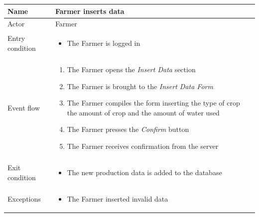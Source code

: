 \begin{table}[H]
    \begin{tabu} to \textwidth {|X|X[4]|}
        \hline
        Name            & Farmer inserts data  \\ \hline
        Actor           & Farmer                      \\ \hline
        Entry condition & \begin{itemize}
            \item The Farmer is logged in
        \end{itemize} \\ \hline
        Event flow      & \begin{enumerate}
            \item The Farmer opens the \emph{Insert Data} section
            \item The Farmer is brought to the \emph{Insert Data Form} 
            \item The Farmer compiles the form inserting the type of crop the amount of crop and the amount of water used
            \item The Farmer presses the \emph{Confirm} button
            \item The Farmer receives confirmation from the server
        \end{enumerate} \\ \hline
        Exit condition  & \begin{itemize}
            \item The new production data is added to the database
        \end{itemize} \\ \hline
        Exceptions      & \begin{itemize}
            \item The Farmer inserted invalid data
        \end{itemize} \\ \hline
    \end{tabu}
\end{table}


